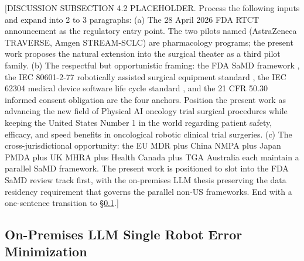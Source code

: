 [DISCUSSION SUBSECTION 4.2 PLACEHOLDER. Process the following inputs and expand into 2 to 3 paragraphs:
(a) The 28 April 2026 FDA RTCT announcement \cite{fda2026realtime} as the regulatory entry point. The two pilots named (AstraZeneca TRAVERSE, Amgen STREAM-SCLC) are pharmacology programs; the present work proposes the natural extension into the surgical theater as a third pilot family.
(b) The respectful but opportunistic framing: the FDA SaMD framework \cite{fda-samd}, the IEC 80601-2-77 robotically assisted surgical equipment standard \cite{iec-80601-2-77}, the IEC 62304 medical device software life cycle standard \cite{iec-62304}, and the 21 CFR 50.30 informed consent obligation \cite{cfr-21-50-30} are the four anchors. Position the present work as advancing the new field of Physical AI oncology trial surgical procedures while keeping the United States Number 1 in the world regarding patient safety, efficacy, and speed benefits in oncological robotic clinical trial surgeries.
(c) The cross-jurisdictional opportunity: the EU MDR plus China NMPA plus Japan PMDA plus UK MHRA plus Health Canada plus TGA Australia each maintain a parallel SaMD framework. The present work is positioned to slot into the FDA SaMD review track first, with the on-premises LLM thesis preserving the data residency requirement that governs the parallel non-US frameworks.
End with a one-sentence transition to \S \ref{sec:discussion-onprem}.]

\subsection{On-Premises LLM Single Robot Error Minimization}
\label{sec:discussion-onprem}

